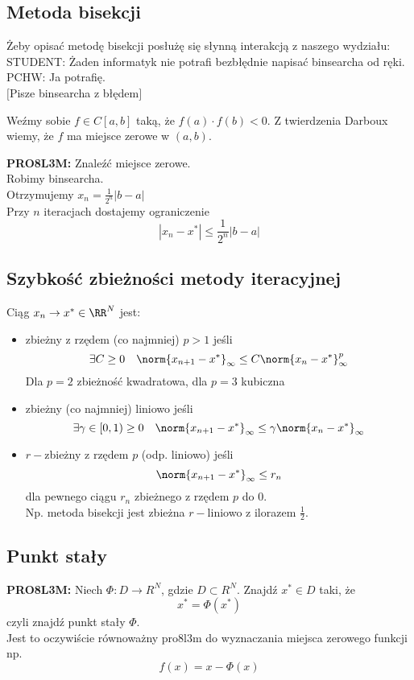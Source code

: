 \subsection{Metoda bisekcji}
Żeby opisać metodę bisekcji posłużę się słynną interakcją z naszego wydziału:\\


STUDENT: Żaden informatyk nie potrafi bezbłędnie napisać binsearcha od ręki.\\
PCHW: Ja potrafię. \\
$[$Pisze binsearcha z błędem$]$

Weźmy sobie $f \in C[a,b]$ taką, że $f(a) \cdot f(b) < 0$. Z twierdzenia Darboux wiemy, że $f$ ma miejsce zerowe w $(a,b)$.

\textbf{PRO8L3M:} Znaleźć miejsce zerowe. \\

Robimy binsearcha.\\
Otrzymujemy $x_n = \frac{1}{2^n}|b-a|$\\
Przy $n$ iteracjach dostajemy ograniczenie
$$
|x_n-x^*| \leq \frac{1}{2^n} |b - a|
$$

\subsection{Szybkość zbieżności metody iteracyjnej}
Ciąg $x_n \to x^* \in \RR^N$ jest: 
\begin{itemize}
    \item zbieżny z rzędem (co najmniej) $p > 1$ jeśli
    $$
    \exists C \geq 0 \quad \norm{x_{n+1}-  x^*}_{\infty} \leq C \norm{x_n - x^*}_{\infty}^p
    $$
    Dla $p=2$ zbieżność kwadratowa, dla $p=3$ kubiczna
    
    \item zbieżny (co najmniej) liniowo jeśli
    $$  
    \exists \gamma \in [0,1) \geq 0 \quad \norm{x_{n+1}-  x^*}_{\infty} \leq \gamma \norm{x_n - x^*}_{\infty}
    $$

    \item $r-$zbieżny z rzędem $p$ (odp. liniowo) jeśli
    $$  
    \norm{x_{n+1}-  x^*}_{\infty} \leq r_n
    $$
    dla pewnego ciągu $r_n$ zbieżnego z rzędem $p$ do 0.\\
    Np. metoda bisekcji jest zbieżna $r-$liniowo z ilorazem $\frac{1}{2}$.
\end{itemize}

\subsection{Punkt stały}
\textbf{PRO8L3M:} Niech $\Phi: D \to R^N$, gdzie $D \subset R^N$. Znajdź $x^*\in D$ taki, że 
$$
x^* = \Phi(x^*)
$$
czyli znajdź punkt stały $\Phi$.\\
Jest to oczywiście równoważny pro8l3m do wyznaczania miejsca zerowego funkcji np.
$$
f(x)= x - \Phi(x)
$$

